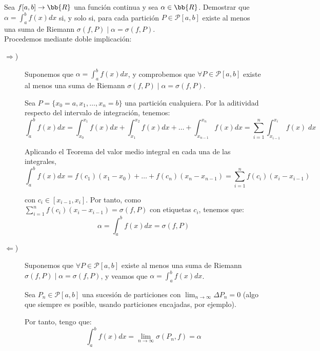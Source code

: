 \begin{ejercicio} Sea $f[a,b]\to \bb{R}$ una función continua y sea $\alpha\in \bb{R}$. Demostrar que $\alpha=\int_a^bf(x)dx$ si, y solo si, para cada partición $P\in \mathscr{P}[a,b]$ existe al menos una suma de Riemann $\sigma(f,P)\mid \alpha=\sigma(f,P)$.\\

    Procedemos mediante doble implicación:
    \begin{description}
        \item [$\Longrightarrow$)] Suponemos que $\alpha=\int_a^bf(x)dx$, y comprobemos que $\forall P\in \mathscr{P}[a,b]$ existe al menos una suma de Riemann $\sigma(f,P)\mid \alpha=\sigma(f,P)$.

        Sea $P=\{x_0=a,x_1,\dots,x_n=b\}$ una partición cualquiera. Por la aditividad respecto del intervalo de integración, tenemos:
        \begin{equation*}
            \int_a^b f(x)dx = \int_{x_0}^{x_1} f(x)dx + \int_{x_1}^{x_2} f(x)dx + \dots + \int_{x_{n-1}}^{x_n} f(x)dx = \sum_{i=1}^n \int_{x_{i-1}}^{x_i} f(x)\;dx
        \end{equation*}
    
        Aplicando el Teorema del valor medio integral en cada una de las integrales,
        \begin{equation*}
            \int_a^b f(x)dx = f(c_1)(x_1-x_0) + \dots + f(c_n)(x_n-x_{n-1}) = \sum_{i=1}^n f(c_i)(x_i - x_{i-1})
        \end{equation*}
    
        con $c_i\in [x_{i-1},x_i]$. Por tanto, como $\sum_{i=1}^n f(c_i)(x_i - x_{i-1})=\sigma(f,P)$ con etiquetas $c_i$, tenemos que:
        \begin{equation*}
            \alpha = \int_a^bf(x)dx = \sigma(f,P)
        \end{equation*}


        \item [$\Longleftarrow$)] Suponemos que $\forall P\in \mathscr{P}[a,b]$ existe al menos una suma de Riemann $\sigma(f,P)\mid \alpha=\sigma(f,P)$, y veamos que $\alpha=\int_a^bf(x)dx$.


        Sea $P_n\in \mathscr{P}[a,b]$ una sucesión de particiones con $\displaystyle \lim_{n\to\infty}\Delta P_n = 0$ (algo que siempre es posible, usando particiones encajadas, por ejemplo).

        Por tanto, tengo que:
        \begin{equation*}
            \int_a^b f(x)dx = \lim_{n\to \infty}  \sigma(P_n,f) = \alpha
        \end{equation*}

        
        
    \end{description}
    
    

    
\end{ejercicio}

